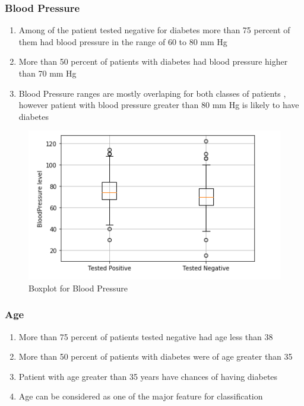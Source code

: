 \documentclass[12pt]{article}
\begin{document}
\subsubsection{Blood Pressure}

\begin{enumerate}
\item Among of the patient tested negative for diabetes more than 75 percent of them had blood pressure in the range of 60 to 80 mm Hg
\item More than 50 percent of patients with diabetes had blood pressure higher than 70 mm Hg
\item Blood Pressure ranges are mostly overlaping for both classes of patients , however patient with blood pressure greater than 80 mm Hg is likely to have diabetes
\end{enumerate}

\begin{figure}[h]
\centering
\includegraphics[scale=0.65]{boxplot_BP.PNG} 
\caption{Boxplot for Blood Pressure}
\label{etiqueta}
\end{figure}

\subsubsection{Age}

\begin{enumerate}
\item More than 75 percent of patients tested negative had age less than 38
\item More than 50 percent of patients with diabetes were of age greater than 35
\item Patient with age greater than 35 years have chances of having diabetes
\item Age can be considered as one of the major feature for classification
\end{enumerate}
\end{document}
